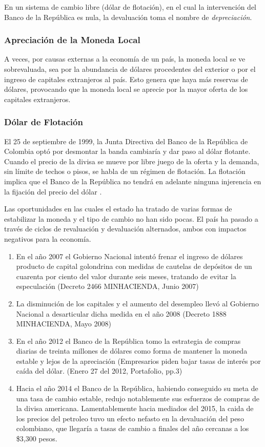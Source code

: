 En un sistema de cambio libre (dólar de flotación), en el cual la intervención del Banco de la República es nula, la devaluación toma el nombre de \textit{depreciación}.

\subsubsection{Apreciación de la Moneda Local}
A veces, por causas externas a la economía de un país, la moneda local se ve sobrevaluada, sea por la abundancia de dólares procedentes del exterior o por el ingreso de capitales extranjeros al país. Esto genera que haya más reservas de dólares, provocando que la moneda local se aprecie por la mayor oferta de los capitales extranjeros.

\subsubsection{Dólar de Flotación}
El 25 de septiembre de 1999, la Junta Directiva del Banco de la República de Colombia optó por desmontar la banda cambiaría y dar paso al dólar flotante. Cuando el precio de la divisa se mueve por libre juego de la oferta y la demanda, sin límite de techos o pisos, se habla de un régimen de flotación. La flotación implica que el Banco de la República no tendrá en adelante ninguna injerencia en la fijación del precio del dólar \cite{cardenas}.

Las oportunidades en las cuales el estado ha tratado de varias formas de estabilizar la moneda y el tipo de cambio no han sido pocas. El país ha pasado a través de ciclos de revaluación y devaluación alternados, ambos con impactos negativos para la economía.

\begin{enumerate}
	\item En el año 2007 el Gobierno Nacional intentó frenar el ingreso de dólares producto de capital golondrina con medidas de cautelas de depósitos de un cuarenta por ciento del valor durante seis meses, tratando de evitar la especulación (Decreto 2466 MINHACIENDA, Junio 2007)
	\item La disminución de los capitales y el aumento del desempleo llevó al Gobierno Nacional a desarticular dicha medida en el año 2008 (Decreto 1888 MINHACIENDA, Mayo 2008)
	\item En el año 2012 el Banco de la República tomo la estrategia de compras diarias de treinta millones de dólares como forma de mantener la moneda estable y lejos de la apreciación (Empresarios piden bajar tasas de interés por caída del dólar. (Enero 27 del 2012, Portafolio, pp.3)
	\item Hacia el año 2014 el Banco de la República, habiendo conseguido su meta de una tasa de cambio estable, redujo notablemente sus esfuerzos de compras de la divisa americana. Lamentablemente hacia mediados del 2015, la caida de los precios del petroleo tuvo un efecto nefasto en la devaluación del peso colombiano, que llegaría a tasas de cambio a finales del año cercanas a los \$3,300 pesos.
\end{enumerate}

